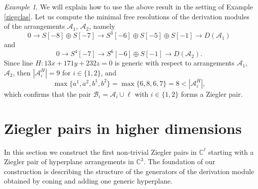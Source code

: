 \documentclass[a4paper,11pt]{amsart}
\def\A{{\mathcal{A}}}%
\numberwithin{equation}{section}
\theoremstyle{remark}
\newtheorem{example}[theorem]{Example}
\begin{document}
\medskip
\begin{example}
We will explain how to use the above result in the setting of Example \ref{ziegclas}.
Let us compute the minimal free resolutions of the derivation modules of the arrangements $\mathcal{A}_{1}$, $\mathcal{A}_{2}$, namely
$$0 \rightarrow S[-8] \oplus S[-7] \rightarrow S^{3}[-6]\oplus S[-5]\oplus S[-1] \rightarrow D(\mathcal{A}_{1})$$
and
$$0 \rightarrow S^{4}[-7] \rightarrow S^{6}[-6] \oplus S[-1] \rightarrow D(\mathcal{A}_{2}).$$
Since line $H : 13x+171y+232z=0$ is generic with respect to arrangements $\mathcal{A}_{1}$, $\mathcal{A}_{2}$, then $|\A_i^{H}| = 9$ for $i \in \{1,2\}$, and 
$$\max\{a^1,a^2,b^1,b^2\}= \max\{6,8,6,7\} = 8 < |\A_i^{H}|,$$
which confirms that the pair $\mathcal{B}_{i} = \mathcal{A}_{i} \cup \ell$ with $i \in \{1,2\}$ forms a Ziegler pair.
\end{example}


\section{Ziegler pairs in higher dimensions}\label{sec:general}

In this section we construct the first non-trivial Ziegler pairs in $\mathbb{C}^{\ell}$ starting with a Ziegler pair of hyperplane arrangements in $\mathbb{C}^{3}$.
The foundation of our construction is describing the structure of the generators of the derivation module obtained by coning and adding one generic hyperplane.
\end{document}
